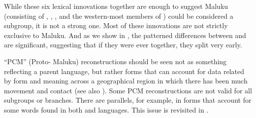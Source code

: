 While these six lexical innovations together are enough to suggest
 Maluku (consisting of ,
, , and the western-most members of )
could be considered a subgroup,
it is not a strong one.
Most of these innovations are not strictly exclusive to  Maluku.
And as we show in ,
the patterned differences between 
and  are significant,
suggesting that if they were ever together,
they split very early.

“PCM” (Proto- Maluku) reconstructions should be seen not
as something reflecting a parent language,
but rather forms that can account for data related by form
and meaning across a geographical region in which there has been
much movement and contact (see also ).
Some PCM reconstructions are not valid for all subgroups or branches.
There are parallels, for example,
in forms that account for some words found in
both  and  languages.
This issue is revisited in .

